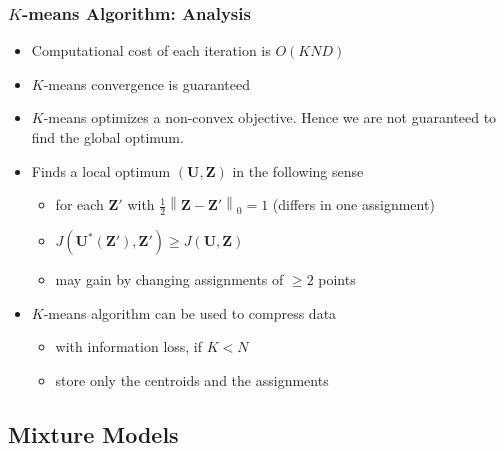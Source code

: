 \documentclass[conference,11pt]{IEEEtran}
\DeclareMathOperator*{\argmin}{\arg\!\min}
\newcommand{\norm}[1]{\left\lVert#1\right\rVert}
\newcommand{\matr}[1]{\boldsymbol{\mathbf{#1}}}
\newcommand{\vect}[1]{\boldsymbol{\mathbf{#1}}}
\begin{document}
\subsubsection{$K$-means Algorithm: Analysis}
\begin{itemize}
  \item Computational cost of each iteration is $O(KND)$
  \item $K$-means convergence is guaranteed
  \item $K$-means optimizes a non-convex objective. Hence we are not guaranteed
    to find the global optimum.
  \item Finds a local optimum $(\matr{U},\matr{Z})$ in the following sense
    \begin{itemize}
      \item for each $\matr{Z}'$ with $\frac{1}{2}\norm{\matr{Z}-\matr{Z}'}_0 = 1$
        (differs in one assignment)
      \item $J(\matr{U}^*(\matr{Z}'), \matr{Z}') \geq J(\matr{U},\matr{Z})$
      \item may gain by changing assignments of $\geq 2$ points
    \end{itemize}
  \item $K$-means algorithm can be used to compress data
    \begin{itemize}
      \item with information loss, if $K < N$
      \item store only the centroids and the assignments
    \end{itemize}
\end{itemize}

\subsection{Mixture Models}
\end{document}
